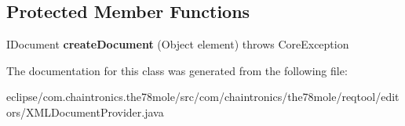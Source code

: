 \subsection*{Protected Member Functions}
\begin{DoxyCompactItemize}
\item 
I\+Document {\bfseries create\+Document} (Object element)  throws Core\+Exception \hypertarget{classcom_1_1chaintronics_1_1the78mole_1_1reqtool_1_1editors_1_1XMLDocumentProvider_a7d2690b6595c0c22d70650ff3f66bf05}{}\label{classcom_1_1chaintronics_1_1the78mole_1_1reqtool_1_1editors_1_1XMLDocumentProvider_a7d2690b6595c0c22d70650ff3f66bf05}

\end{DoxyCompactItemize}


The documentation for this class was generated from the following file\+:\begin{DoxyCompactItemize}
\item 
eclipse/com.\+chaintronics.\+the78mole/src/com/chaintronics/the78mole/reqtool/editors/X\+M\+L\+Document\+Provider.\+java\end{DoxyCompactItemize}

